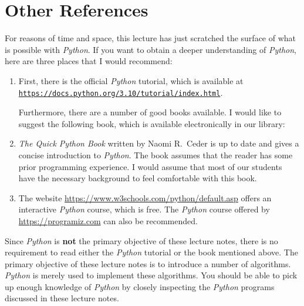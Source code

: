 \section{Other References}
For reasons of time and space, this lecture has just scratched the surface of what is possible with
\textsl{Python}.  If you want to obtain a deeper understanding of \textsl{Python}, here are three places that 
I would recommend:
\begin{enumerate}
\item First, there is the official \textsl{Python} tutorial, which is available at
      \\[0.2cm]
      \hspace*{1.3cm}
      \href{https://docs.python.org/3.10/tutorial/index.html}{\texttt{https://docs.python.org/3.10/tutorial/index.html}}.

      Furthermore, there are a number of good books available.  I would like to suggest the following 
      book, which is available electronically in our library:
\item \emph{The Quick Python Book} written by Naomi R.~Ceder \cite{ceder:2018} is up to date and gives a
      concise introduction to \textsl{Python}.  The book assumes that the reader has some prior programming
      experience.  I would assume that most of our students have the necessary background to feel comfortable
      with this book.
\item The website
      \href{https://www.w3schools.com/python/default.asp}{https://www.w3schools.com/python/default.asp}
      offers an interactive \textsl{Python} course, which is free.
      The \textsl{Python} course offered by \href{https://programiz.com}{https://programiz.com} 
      can also be recommended.  
\end{enumerate}
Since \textsl{Python} is \textbf{not} the primary objective of these lecture notes, there is no requirement to read
either the \textsl{Python} tutorial or the book mentioned above.  The primary objective of these
lecture notes is to introduce a number of algorithms.
\textsl{Python} is merely used to implement these algorithms.  You should
be able to pick up enough knowledge of \textsl{Python} by closely inspecting the \textsl{Python} programs
discussed in these lecture notes.  
\pagebreak

